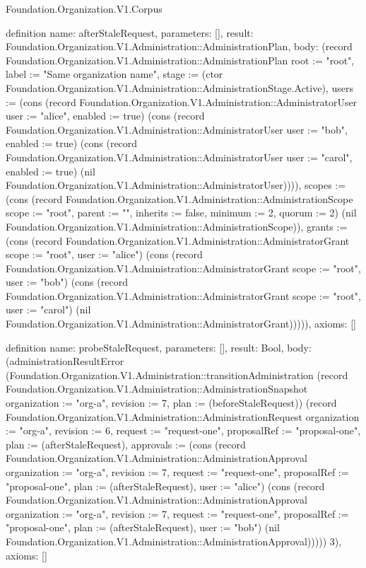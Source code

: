 \begin{lexlean}{Foundation.Organization.V1.Corpus}
\begin{semanticmodule}
definition{
  name: afterStaleRequest,
  parameters: [],
  result: Foundation.Organization.V1.Administration::AdministrationPlan,
  body: (record Foundation.Organization.V1.Administration::AdministrationPlan {root := "root", label := "Same organization name", stage := (ctor Foundation.Organization.V1.Administration::AdministrationStage.Active), users := (cons (record Foundation.Organization.V1.Administration::AdministratorUser {user := "alice", enabled := true}) (cons (record Foundation.Organization.V1.Administration::AdministratorUser {user := "bob", enabled := true}) (cons (record Foundation.Organization.V1.Administration::AdministratorUser {user := "carol", enabled := true}) (nil Foundation.Organization.V1.Administration::AdministratorUser)))), scopes := (cons (record Foundation.Organization.V1.Administration::AdministrationScope {scope := "root", parent := "", inherits := false, minimum := 2, quorum := 2}) (nil Foundation.Organization.V1.Administration::AdministrationScope)), grants := (cons (record Foundation.Organization.V1.Administration::AdministratorGrant {scope := "root", user := "alice"}) (cons (record Foundation.Organization.V1.Administration::AdministratorGrant {scope := "root", user := "bob"}) (cons (record Foundation.Organization.V1.Administration::AdministratorGrant {scope := "root", user := "carol"}) (nil Foundation.Organization.V1.Administration::AdministratorGrant))))}),
  axioms: []
}

definition{
  name: probeStaleRequest,
  parameters: [],
  result: Bool,
  body: (administrationResultError (Foundation.Organization.V1.Administration::transitionAdministration (record Foundation.Organization.V1.Administration::AdministrationSnapshot {organization := "org-a", revision := 7, plan := (beforeStaleRequest)}) (record Foundation.Organization.V1.Administration::AdministrationRequest {organization := "org-a", revision := 6, request := "request-one", proposalRef := "proposal-one", plan := (afterStaleRequest), approvals := (cons (record Foundation.Organization.V1.Administration::AdministrationApproval {organization := "org-a", revision := 7, request := "request-one", proposalRef := "proposal-one", plan := (afterStaleRequest), user := "alice"}) (cons (record Foundation.Organization.V1.Administration::AdministrationApproval {organization := "org-a", revision := 7, request := "request-one", proposalRef := "proposal-one", plan := (afterStaleRequest), user := "bob"}) (nil Foundation.Organization.V1.Administration::AdministrationApproval)))})) 3),
  axioms: []
}


\end{semanticmodule}
\end{lexlean}
